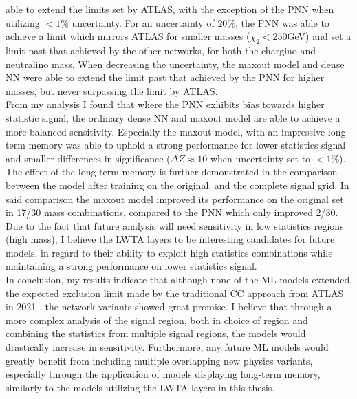 able to extend the limits set by \ac{ATLAS}, with the exception of the \ac{PNN} when utilizing $<1\%$ uncertainty. For an uncertainty of $20\%$, the \ac{PNN} was able to achieve a limit which mirrors \ac{ATLAS} for smaller masses ($\tilde{\chi}_2<250$GeV)
and set a limit past that achieved by the other networks, for both the chargino and neutralino mass. When decreasing the uncertainty, the maxout model and dense \ac{NN} were able to extend the limit past that achieved by the \ac{PNN} for higher masses, 
but never surpassing the limit by \ac{ATLAS}.
\\\newline
From my analysis I found that where the \ac{PNN} exhibits bias towards higher statistic signal, the ordinary dense \ac{NN} and maxout model are able to achieve a more balanced sensitivity. Especially the 
maxout model, with an impressive long-term memory was able to uphold a strong performance for lower statistics signal and smaller differences in significance ($\Delta Z \approx 10$ when uncertainty set to $<1\%$). The effect of the long-term memory 
is further demonstrated in the comparison between the model after training on the original, and the complete signal grid. In said comparison the maxout model improved its performance on the original set in 17/30 mass combinations, compared to the \ac{PNN} which only improved
2/30. Due to the fact that future analysis will need sensitivity in low statistics regions (high mass), I believe the \ac{LWTA} layers to be interesting candidates for future models, in regard to their ability to exploit high statistics combinations while maintaining a 
strong performance on lower statistics signal. 
\\\newline
In conclusion, my results indicate that although none of the \ac{ML} models extended the expected exclusion limit made by the traditional \ac{CC} approach from \ac{ATLAS} in 2021 \cite{atlas_search_2021}, the network variants showed great promise. I believe
that through a more complex analysis of the signal region, both in choice of region and combining the statistics from multiple signal regions, the models would drastically increase in sensitivity. Furthermore, any future \ac{ML} models would greatly benefit from
including multiple overlapping new physics variants, especially through the application of models displaying long-term memory, similarly to the models utilizing the \ac{LWTA} layers in this thesis.
